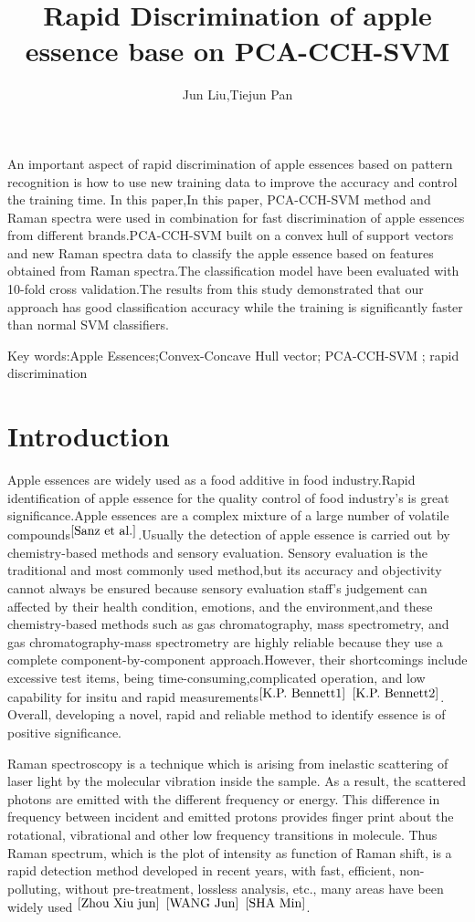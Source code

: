 \documentclass[a4paper]{article}
\date{} %
\title{Rapid Discrimination of apple essence base on PCA-CCH-SVM  }
\author{Jun Liu,Tiejun Pan}
\begin{document}
\maketitle

An important aspect of rapid discrimination of apple essences based on pattern recognition is how to use new training data to improve the accuracy and control the training time. In this paper,In this paper, PCA-CCH-SVM method and Raman spectra were used in combination for fast discrimination of apple essences from different brands.PCA-CCH-SVM built on a convex hull of support vectors and new Raman spectra data to classify the apple essence based on features obtained from Raman spectra.The classification model have been evaluated with 10-fold cross validation.The results from this study demonstrated that our approach has good classiﬁcation accuracy while the training is signiﬁcantly faster than normal SVM classiﬁers.

Key words:Apple Essences;Convex-Concave Hull vector; PCA-CCH-SVM ; rapid discrimination

\section{Introduction}
Apple essences are widely used as a food additive in food industry.Rapid identification of apple essence for the quality control of food industry's  is great significance.Apple essences are a complex mixture of a large number of volatile compounds$^{\cite{Sanz et al.}}$.Usually the detection of apple essence is carried out by chemistry-based methods and sensory evaluation. Sensory evaluation is the traditional and most commonly used method,but its accuracy and objectivity cannot always be ensured because sensory evaluation staff’s judgement can affected by their health condition, emotions, and the environment,and these chemistry-based methods such as gas chromatography, mass spectrometry, and gas chromatography-mass spectrometry are highly reliable because they use a complete component-by-component approach.However, their shortcomings include excessive test items, being time-consuming,complicated operation, and low capability for insitu and rapid measurements$^{\cite{K.P. Bennett1}}$ $^{\cite{K.P. Bennett2}}$. Overall, developing a novel, rapid and reliable method to identify  essence is of positive significance.

Raman spectroscopy is a technique which is arising from inelastic scattering of laser light by the molecular vibration inside the sample. As a result, the scattered photons are emitted with the different frequency or energy. This difference in frequency between incident and emitted protons provides finger print about the rotational, vibrational and other low frequency transitions in molecule. Thus Raman spectrum, which is the plot of intensity as function of Raman shift, is a rapid detection method developed in recent years, with fast, efficient, non-polluting, without pre-treatment, lossless analysis, etc., many areas have been widely used $^{\cite{Zhou Xiu jun}}$
$^{\cite{WANG Jun}}$ $^{\cite{SHA Min}}$.
\end{document}

